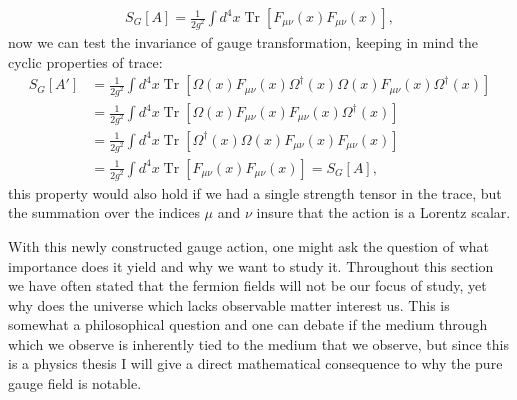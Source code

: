 \documentclass[english,twoside,openright]{UH_TCM_MSc}
\DeclareMathOperator{\Tr}{Tr}
\begin{document}
\begin{align}
    S_G[A] = \frac{1}{2g^2}\int d^4 x \Tr[F_{\mu\nu}(x)F_{\mu\nu}(x)], \label{eq:action_continuum}
\end{align}
now we can test the invariance of gauge transformation, keeping in mind the cyclic properties of trace:
\begin{align}
    S_G[A'] &= \frac{1}{2g^2}\int d^4 x \Tr[\Omega(x)F_{\mu\nu}(x) \Omega^\dagger(x)\Omega(x)F_{\mu\nu}(x) \Omega^\dagger(x)] \\
    &=\frac{1}{2g^2}\int d^4 x \Tr[\Omega(x)F_{\mu\nu}(x)F_{\mu\nu}(x) \Omega^\dagger(x)]\\
    &=\frac{1}{2g^2}\int d^4 x \Tr[\Omega^\dagger(x)\Omega(x)F_{\mu\nu}(x)F_{\mu\nu}(x) ] \\
    &=\frac{1}{2g^2}\int d^4 x \Tr[F_{\mu\nu}(x)F_{\mu\nu}(x) ] = S_G[A],
\end{align}
this property would also hold if we had a single strength tensor in the trace, but the summation over the indices $\mu$ and $\nu$ insure that the action is a Lorentz scalar.

With this newly constructed gauge action, one might ask the question of what importance does it yield and why we want to study it. Throughout this section we have often stated that the fermion fields will not be our focus of study, yet why does the universe which lacks observable matter interest us. This is somewhat a philosophical question and one can debate if the medium through which we observe is inherently tied to the medium that we observe, but since this is a physics thesis I will give a direct mathematical consequence to why the pure gauge field is notable. 
\end{document}
